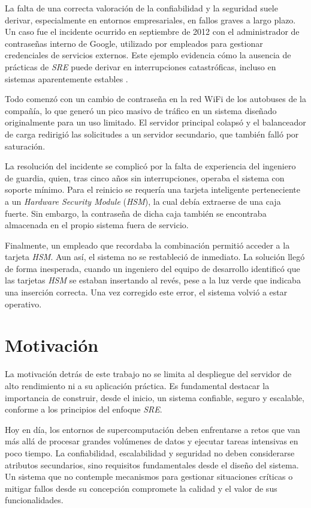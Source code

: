 La falta de una correcta valoración de la confiabilidad y la seguridad suele derivar, especialmente en entornos empresariales, en fallos graves a largo plazo. Un caso fue el incidente ocurrido en septiembre de 2012 con el administrador de contraseñas interno de Google, utilizado por empleados para gestionar credenciales de servicios externos. Este ejemplo evidencia cómo la ausencia de prácticas de \textit{SRE} puede derivar en interrupciones catastróficas, incluso en sistemas aparentemente estables \cite{ref6}.

Todo comenzó con un cambio de contraseña en la red WiFi de los autobuses de la compañía, lo que generó un pico masivo de tráfico en un sistema diseñado originalmente para un uso limitado. El servidor principal colapsó y el balanceador de carga redirigió las solicitudes a un servidor secundario, que también falló por saturación.

La resolución del incidente se complicó por la falta de experiencia del ingeniero de guardia, quien, tras cinco años sin interrupciones, operaba el sistema con soporte mínimo. Para el reinicio se requería una tarjeta inteligente perteneciente a un \textit{Hardware Security Module} (\textit{HSM}), la cual debía extraerse de una caja fuerte. Sin embargo, la contraseña de dicha caja también se encontraba almacenada en el propio sistema fuera de servicio.

Finalmente, un empleado que recordaba la combinación permitió acceder a la tarjeta \textit{HSM}. Aun así, el sistema no se restableció de inmediato. La solución llegó de forma inesperada, cuando un ingeniero del equipo de desarrollo identificó que las tarjetas \textit{HSM} se estaban insertando al revés, pese a la luz verde que indicaba una inserción correcta. Una vez corregido este error, el sistema volvió a estar operativo.

\section{Motivación}
La motivación detrás de este trabajo no se limita al despliegue del servidor de alto rendimiento ni a su aplicación práctica. Es fundamental destacar la importancia de construir, desde el inicio, un sistema confiable, seguro y escalable, conforme a los principios del enfoque \textit{SRE}.

Hoy en día, los entornos de supercomputación deben enfrentarse a retos que van más allá de procesar grandes volúmenes de datos y ejecutar tareas intensivas en poco tiempo. La confiabilidad, escalabilidad y seguridad no deben considerarse atributos secundarios, sino requisitos fundamentales desde el diseño del sistema. Un sistema que no contemple mecanismos para gestionar situaciones críticas o mitigar fallos desde su concepción compromete la calidad y el valor de sus funcionalidades.


